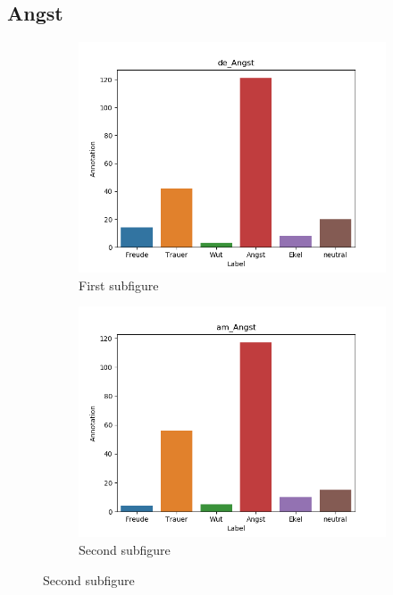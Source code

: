 \documentclass[11pt,a4paper,headsepline,twoside,toc=bibliography]{scrreprt}
\begin{document}
\subsection{Angst}
\begin{figure}[t!] %
	\begin{subfigure}{0.48\textwidth}
		\includegraphics[width=\linewidth]{plots/de_Angst.png}
		\caption{First subfigure} \label{fig:de_A}
	\end{subfigure}\hspace*{\fill}
	\begin{subfigure}{0.48\textwidth}
		\includegraphics[width=\linewidth]{plots/am_Angst.png}
		\caption{Second subfigure} \label{fig:am_A}
	\end{subfigure}
	

\end{figure}
\end{document}
